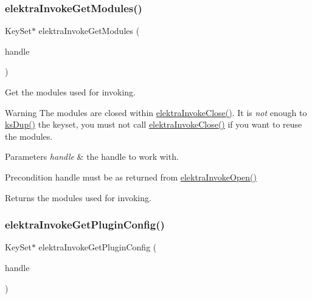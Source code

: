 \subsubsection{\texorpdfstring{elektra\+Invoke\+Get\+Modules()}{elektraInvokeGetModules()}}
{\footnotesize\ttfamily Key\+Set$\ast$ elektra\+Invoke\+Get\+Modules (\begin{DoxyParamCaption}\item[{Elektra\+Invoke\+Handle $\ast$}]{handle }\end{DoxyParamCaption})}



Get the modules used for invoking. 

\begin{DoxyWarning}{Warning}
The modules are closed within \hyperlink{group__invoke_ga684a21daa0b3c20783c55184a9157b3b}{elektra\+Invoke\+Close()}. It is {\itshape not} enough to \hyperlink{group__keyset_gac59e4b328245463f1451f68d5106151c}{ks\+Dup()} the keyset, you must not call \hyperlink{group__invoke_ga684a21daa0b3c20783c55184a9157b3b}{elektra\+Invoke\+Close()} if you want to reuse the modules.
\end{DoxyWarning}

\begin{DoxyParams}{Parameters}
{\em handle} & the handle to work with.\\
\hline
\end{DoxyParams}
\begin{DoxyPrecond}{Precondition}
handle must be as returned from \hyperlink{group__invoke_ga3eb20131e9a8fc9a6cebf126927c09bc}{elektra\+Invoke\+Open()}
\end{DoxyPrecond}
\begin{DoxyReturn}{Returns}
the modules used for invoking. 
\end{DoxyReturn}
\mbox{\label{group__invoke_gafc090b80f3ba846bf3c3fd8ccd34f2f5}} 
\subsubsection{\texorpdfstring{elektra\+Invoke\+Get\+Plugin\+Config()}{elektraInvokeGetPluginConfig()}}
{\footnotesize\ttfamily Key\+Set$\ast$ elektra\+Invoke\+Get\+Plugin\+Config (\begin{DoxyParamCaption}\item[{Elektra\+Invoke\+Handle $\ast$}]{handle }\end{DoxyParamCaption})}



